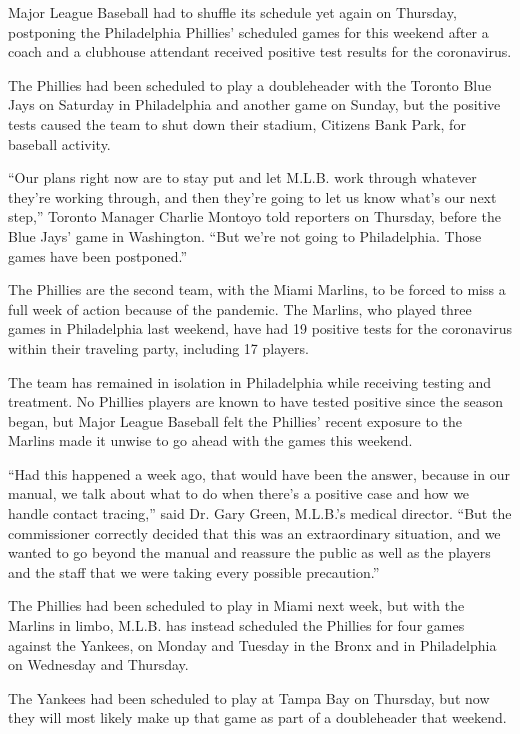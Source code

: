 Major League Baseball had to shuffle its schedule yet again on Thursday,
postponing the Philadelphia Phillies' scheduled games for this weekend
after a coach and a clubhouse attendant received positive test results
for the coronavirus.

The Phillies had been scheduled to play a doubleheader with the Toronto
Blue Jays on Saturday in Philadelphia and another game on Sunday, but
the positive tests caused the team to shut down their stadium, Citizens
Bank Park, for baseball activity.

``Our plans right now are to stay put and let M.L.B. work through
whatever they're working through, and then they're going to let us know
what's our next step,'' Toronto Manager Charlie Montoyo told reporters
on Thursday, before the Blue Jays' game in Washington. ``But we're not
going to Philadelphia. Those games have been postponed.''

The Phillies are the second team, with the Miami Marlins, to be forced
to miss a full week of action because of the pandemic. The Marlins, who
played three games in Philadelphia last weekend, have had 19 positive
tests for the coronavirus within their traveling party, including 17
players.

The team has remained in isolation in Philadelphia while receiving
testing and treatment. No Phillies players are known to have tested
positive since the season began, but Major League Baseball felt the
Phillies' recent exposure to the Marlins made it unwise to go ahead with
the games this weekend.

``Had this happened a week ago, that would have been the answer, because
in our manual, we talk about what to do when there's a positive case and
how we handle contact tracing,'' said Dr. Gary Green, M.L.B.'s medical
director. ``But the commissioner correctly decided that this was an
extraordinary situation, and we wanted to go beyond the manual and
reassure the public as well as the players and the staff that we were
taking every possible precaution.''

The Phillies had been scheduled to play in Miami next week, but with the
Marlins in limbo, M.L.B. has instead scheduled the Phillies for four
games against the Yankees, on Monday and Tuesday in the Bronx and in
Philadelphia on Wednesday and Thursday.

The Yankees had been scheduled to play at Tampa Bay on Thursday, but now
they will most likely make up that game as part of a doubleheader that
weekend.

